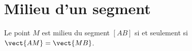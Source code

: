 \section{Milieu d'un segment}

\begin{propriete}\label{PropFHznUfJ}

        Le point \( M\) est milieu du segment \( [AB]\) si et seulement si \( \vect{ AM }=\vect{ MB }\).

        \begin{center}
   
        \end{center}

\end{propriete}
